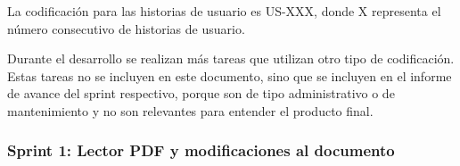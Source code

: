 La codificación para las historias de usuario es US-XXX, donde X representa el número consecutivo de historias de usuario. 

Durante el desarrollo se realizan más tareas que utilizan otro tipo de codificación. Estas tareas no se incluyen en este documento, sino que se incluyen en el informe de avance del sprint respectivo, porque son de tipo  administrativo o de mantenimiento y no son relevantes para entender el producto final.



\subsubsection{Sprint 1: Lector PDF y modificaciones al documento}

